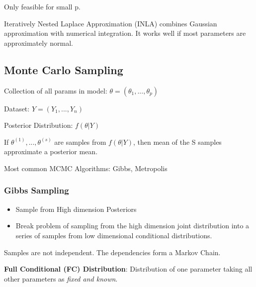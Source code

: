 \documentclass[11pt]{article}
\begin{document}
Only feasible for small p.

Iteratively Nested Laplace Approximation (INLA) combines Gaussian approximation
with numerical integration. It works well if most parameters are approximately normal.

\subsection{Monte Carlo Sampling}
\label{sec:orgb107f6f}

Collection of all params in model: \(\theta = (\theta_1, ..., \theta_p)\)

Dataset: \(Y = (Y_1, ..., Y_n)\)

Posterior Distribution: \(f(\theta | Y)\)

If \(\theta^{(1)}, ..., \theta^{(s)}\) are samples from \(f(\theta | Y)\), then mean
of the S samples approximate a posterior mean.

Most common MCMC Algorithms: Gibbs, Metropolis

\subsubsection{Gibbs Sampling}
\label{sec:org7d8af8c}

\begin{itemize}
\item Sample from High dimension Posteriors
\item Break problem of sampling from the high dimension joint distribution into a
series of samples from low dimensional conditional distributions.
\end{itemize}

Samples are not independent. The dependencies form a Markov Chain.

\textbf{Full Conditional (FC) Distribution}: Distribution of one parameter taking all other
 parameters as \emph{fixed and known}.
\end{document}
